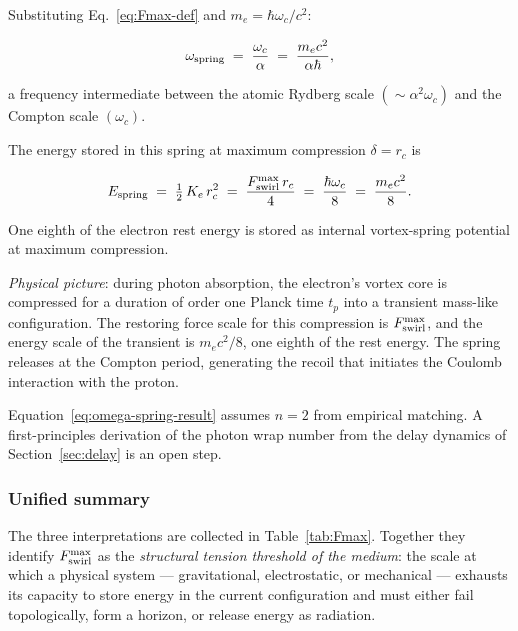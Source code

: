 \noindent
Substituting Eq.~\eqref{eq:Fmax-def} and $m_e = \hbar\omega_c/c^2$:

\begin{equation}
  \omega_{\rm spring}
  \;=\; \frac{\omega_c}{\alpha}
  \;=\; \frac{m_e c^2}{\alpha\hbar},
  \label{eq:omega-spring-result}
\end{equation}

\noindent
a frequency intermediate between the atomic Rydberg scale
$(\sim\!\alpha^2\omega_c)$ and the Compton scale $(\omega_c)$.

 The energy stored in this spring at maximum
compression $\delta = r_c$ is

\begin{equation}
  E_{\rm spring}
  \;=\; \tfrac{1}{2}\,K_e\,r_c^2
  \;=\; \frac{F_{\rm swirl}^{\max}\,r_c}{4}
  \;=\; \frac{\hbar\omega_c}{8}
  \;=\; \frac{m_e c^2}{8}.
  \label{eq:Espring}
\end{equation}

\noindent
One eighth of the electron rest energy is stored as internal
vortex-spring potential at maximum compression.

 \textit{Physical picture}: during
photon absorption, the electron's vortex core is compressed
for a duration of order one Planck time $t_p$ into a transient
mass-like configuration. The restoring force scale for this
compression is $F_{\rm swirl}^{\max}$, and the energy scale
of the transient is $m_e c^2/8$, one eighth of the rest energy.
The spring releases at the Compton period, generating the
recoil that initiates the Coulomb interaction with the proton.

 Equation~\eqref{eq:omega-spring-result}
assumes $n = 2$ from empirical matching. A first-principles
derivation of the photon wrap number from the delay dynamics
of Section~\ref{sec:delay} is an open step.

\subsubsection{Unified summary}

The three interpretations are collected in Table~\ref{tab:Fmax}.
Together they identify $F_{\rm swirl}^{\max}$ as the
\emph{structural tension threshold of the medium}: the scale at
which a physical system --- gravitational, electrostatic, or
mechanical --- exhausts its capacity to store energy in the
current configuration and must either fail topologically,
form a horizon, or release energy as radiation.

